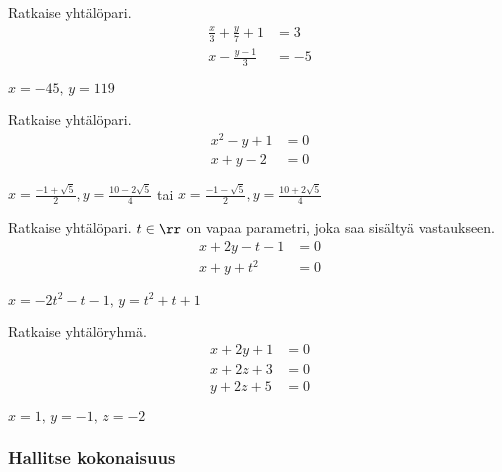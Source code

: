 \begin{tehtavasivu}
\begin{tehtava}
    Ratkaise yhtälöpari.
    \begin{align*}
        \frac{x}{3}+\frac{y}{7} + 1 &= 3 \\
        x - \frac{y-1}{3} &= -5
    \end{align*}
    \begin{vastaus}
        $x = -45, \, y = 119$
    \end{vastaus}
\end{tehtava}

\begin{tehtava}
	Ratkaise yhtälöpari.
	\begin{align*}
		x^2-y+1 &= 0 \\
		x+y-2 &= 0
	\end{align*}
	\begin{vastaus}
		$x = \frac{-1+\sqrt{5}}{2}, y = \frac{10-2\sqrt{5}}{4}$ tai $x = \frac{-1-\sqrt{5}}{2}, y = \frac{10+2\sqrt{5}}{4}$
	\end{vastaus}
\end{tehtava}

\begin{tehtava}
    Ratkaise yhtälöpari. $t \in \rr$ on vapaa parametri, joka saa sisältyä vastaukseen.
    \begin{align*}
        x+2y-t-1 &= 0 \\
        x+y+t^2 &=0
    \end{align*}
    \begin{vastaus}
        $x = -2t^2-t-1, \, y = t^2+t+1$
    \end{vastaus}
\end{tehtava}

\begin{tehtava}
    Ratkaise yhtälöryhmä.   
    \begin{align*}
        x+2y+1 &=0 \\
        x+2z+3 &=0 \\
        y+2z+5 &=0
    \end{align*}
    \begin{vastaus}
        $x = 1, \, y = -1, \, z = -2$
    \end{vastaus}
\end{tehtava}

\subsubsection*{Hallitse kokonaisuus}


\end{tehtavasivu}
